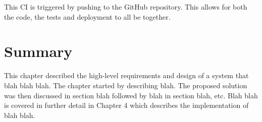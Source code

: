 This CI is triggered by pushing to the GitHub repository. This allows for both the code, the tests and deployment to all be together.

\section{Summary} \label{a-d--summary}

This chapter described the high-level requirements and design of a system that blah blah blah.  The chapter started by describing blah.  The proposed solution was then discussed in section blah followed by blah in section blah, etc.
Blah blah is covered in further detail in Chapter 4 which describes the implementation of blah blah.
